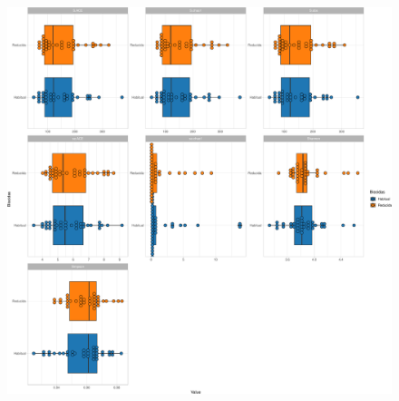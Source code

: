 \documentclass[
  letterpaper,
  DIV=11,
  numbers=noendperiod]{scrartcl}
\begin{document}
\begin{figure}[H]

{\centering \includegraphics{InformeNeiker_files/figure-pdf/unnamed-chunk-7-2.pdf}

}

\end{figure}
\end{document}
